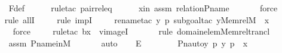 \begin{isabellebody}
\ \ \ \ \isamarkupfalse%
\ F{\isacharunderscore}{\kern0pt}def\isanewline
\ \ \ \ \isamarkupfalse%
\ {\isacharparenleft}{\kern0pt}rule{\isacharunderscore}{\kern0pt}tac\ pair{\isacharunderscore}{\kern0pt}rel{\isacharunderscore}{\kern0pt}eq{\isacharparenright}{\kern0pt}\isanewline
\ \ \ \ \isamarkupfalse%
\ xin\ assm\ relation{\isacharunderscore}{\kern0pt}P{\isacharunderscore}{\kern0pt}name\isanewline
\ \ \ \ \ \isamarkupfalse%
\ force\isanewline
\ \ \ \ \isamarkupfalse%
{\isacharparenleft}{\kern0pt}rule\ allI{\isacharparenright}{\kern0pt}{\isacharplus}{\kern0pt}\isanewline
\ \ \ \ \isamarkupfalse%
{\isacharparenleft}{\kern0pt}rule\ impI{\isacharparenright}{\kern0pt}\isanewline
\ \ \ \ \isamarkupfalse%
{\isacharparenleft}{\kern0pt}rename{\isacharunderscore}{\kern0pt}tac\ y\ p{\isacharcomma}{\kern0pt}\ subgoal{\isacharunderscore}{\kern0pt}tac\ {\isachardoublequoteopen}y{\isasymin}Memrel{\isacharparenleft}{\kern0pt}M{\isacharparenright}{\kern0pt}{\isacharcircum}{\kern0pt}{\isacharplus}{\kern0pt}\ {\isacharminus}{\kern0pt}{\isacharbackquote}{\kern0pt}{\isacharbackquote}{\kern0pt}\ {\isacharbraceleft}{\kern0pt}x{\isacharbraceright}{\kern0pt}{\isachardoublequoteclose}{\isacharparenright}{\kern0pt}\ \isanewline
\ \ \ \ \ \isamarkupfalse%
\ force\isanewline
\ \ \ \ \isamarkupfalse%
{\isacharparenleft}{\kern0pt}rule{\isacharunderscore}{\kern0pt}tac\ b{\isacharequal}{\kern0pt}x\ \ vimageI{\isacharparenright}{\kern0pt}\ \isanewline
\ \ \ \ \ \isamarkupfalse%
{\isacharparenleft}{\kern0pt}rule\ domain{\isacharunderscore}{\kern0pt}elem{\isacharunderscore}{\kern0pt}Memrel{\isacharunderscore}{\kern0pt}trancl{\isacharparenright}{\kern0pt}\isanewline
\ \ \ \ \isamarkupfalse%
\ assm\ P{\isacharunderscore}{\kern0pt}name{\isacharunderscore}{\kern0pt}in{\isacharunderscore}{\kern0pt}M\ \isanewline
\ \ \ \ \isamarkupfalse%
\ auto\isanewline
\ \ \isamarkupfalse%
\ E{}{\isacharcolon}{\kern0pt}\ \isanewline
\ \ \ \ {\isachardoublequoteopen}{\isachardot}{\kern0pt}{\isachardot}{\kern0pt}{\isachardot}{\kern0pt}\ {\isacharequal}{\kern0pt}\ {\isacharbraceleft}{\kern0pt}\ {\isacharless}{\kern0pt}Pn{\isacharunderscore}{\kern0pt}auto{\isacharparenleft}{\kern0pt}{\isasympi}{\isacharparenright}{\kern0pt}{\isacharbackquote}{\kern0pt}y{\isacharcomma}{\kern0pt}\ {\isasympi}{\isacharbackquote}{\kern0pt}p{\isachargreater}{\kern0pt}{\isachardot}{\kern0pt}\ {\isacharless}{\kern0pt}y{\isacharcomma}{\kern0pt}\ p{\isachargreater}{\kern0pt}\ {\isasymin}\ x\ {\isacharbraceright}{\kern0pt}{\isachardoublequoteclose}\isanewline

\end{isabellebody}
